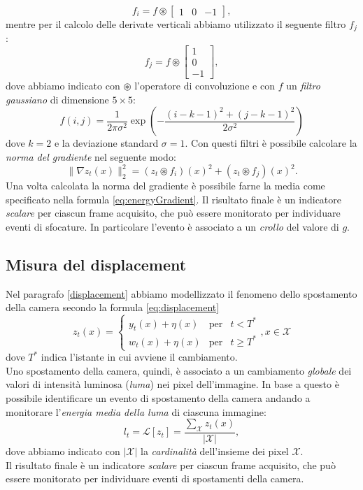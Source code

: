 \[f_i = f \circledast \left[ \begin{array}{rcl}
1 & 0 & -1
\end{array}\right], \] 
mentre per il calcolo delle derivate verticali  abbiamo utilizzato il seguente filtro $f_j$:
\[f_j = f \circledast \left[ \begin{array}{r}
1 \\ 0 \\ -1
\end{array}\right], \]
dove abbiamo indicato con $\circledast$ l'operatore di convoluzione e con $f$ un \textit{filtro gaussiano} di dimensione $5 \times 5$:
\[f(i,j)=\frac{1}{2\pi\sigma^2}\exp\left(-\frac{\left(i-k-1\right)^2+\left(j-k-1\right)^2}{2\sigma^2}\right)\] 
dove $k=2$ e  la deviazione standard $\sigma = 1$.
Con questi filtri \`e possibile calcolare la \textit{norma del gradiente} nel seguente modo:
\[\| \nabla z_t(x) \|_2^2=\left(z_t \circledast f_i\right)(x)^2 + \left(z_t \circledast f_j\right)(x)^2.\]
Una volta calcolata la norma del gradiente \`e possibile farne la media come specificato nella formula \eqref{eq:energyGradient}.
Il risultato finale \`e un indicatore \textit{scalare} per ciascun frame acquisito, che pu\`o essere monitorato per individuare eventi di sfocature. 
In particolare l'evento \`e associato a un \textit{crollo} del valore di $g$.
\subsection{Misura del displacement}
Nel paragrafo \ref{displacement} abbiamo modellizzato il fenomeno dello spostamento della camera secondo la formula \eqref{eq:displacement}
\[z_t(x)  = \left\{ \begin{array}{rcl}
y_t(x) + \eta(x) & \mbox{per} & t < T^* \\
w_t(x) + \eta(x) & \mbox{per} & t \geqslant T^*
\end{array}\right. , x \in \mathcal{X}\]
dove $T^*$ indica l'istante in cui avviene il cambiamento.\\
Uno spostamento della camera, quindi, \`e associato a un cambiamento \textit{globale} dei valori di intensit\`a luminosa (\textit{luma}) nei pixel dell'immagine.
In base a questo \`e possibile identificare un evento di spostamento della camera andando a monitorare l'\textit{energia media della luma} di ciascuna immagine:
\begin{equation}
\label{eq:energyLuma}
l_t = \mathcal{L}[z_t] =\frac{\sum_{\mathcal{X}} z_t(x) }{|\mathcal{X}|} ,
\end{equation}  
dove abbiamo indicato con $|\mathcal{X}|$ la \textit{cardinalit\`a} dell'insieme dei pixel $\mathcal{X}$.\\
Il risultato finale \`e un indicatore \textit{scalare} per ciascun frame acquisito, che pu\`o essere monitorato per individuare eventi di spostamenti della camera. 
